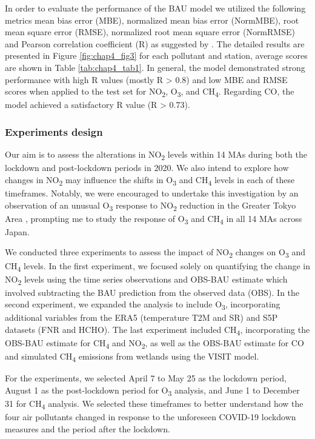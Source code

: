 In order to evaluate the performance of the BAU model we utilized the following metrics mean bias error (MBE), normalized mean bias error (NormMBE), root mean square error (RMSE), normalized root mean square error (NormRMSE) and Pearson correlation coefficient (R) as suggested by \citep{grange2021covid}. The detailed results are presented in Figure \ref{fig:chap4_fig3} for each pollutant and station, average scores are shown in Table \ref{tab:chap4_tab1}. In general, the model demonstrated strong performance with high R values (mostly R > 0.8) and low MBE and RMSE scores when applied to the test set for NO\textsubscript{2}, O\textsubscript{3}, and CH\textsubscript{4}. Regarding CO, the model achieved a satisfactory R value (R > 0.73).\par

\subsubsection{Experiments design}
Our aim is to assess the alterations in NO\textsubscript{2} levels within 14 MAs during both the lockdown and post-lockdown periods in 2020. We also intend to explore how changes in NO\textsubscript{2} may influence the shifts in O\textsubscript{3} and CH\textsubscript{4} levels in each of these timeframes. Notably, we were encouraged to undertake this investigation by an observation of an unusual O\textsubscript{3} response to NO\textsubscript{2} reduction in the Greater Tokyo Area \citep{damiani2022peculiar}, prompting me to study the response of O\textsubscript{3} and CH\textsubscript{4} in all 14 MAs across Japan. \par
We conducted three experiments to assess the impact of NO\textsubscript{2} changes on O\textsubscript{3} and CH\textsubscript{4} levels. In the first experiment, we focused solely on quantifying the change in NO\textsubscript{2} levels using the time series observations and OBS-BAU estimate which involved subtracting the BAU prediction from the observed data (OBS). In the second experiment, we expanded the analysis to include O\textsubscript{3}, incorporating additional variables  from the ERA5 (temperature \textminus T2M and SR) and S5P datasets (FNR and HCHO). The last experiment included CH\textsubscript{4}, incorporating the OBS-BAU estimate for CH\textsubscript{4} and NO\textsubscript{2}, as well as the OBS-BAU estimate for CO and simulated CH\textsubscript{4} emissions from wetlands using the VISIT model. \par
For the experiments, we selected April 7 to May 25 as the lockdown period, August 1 as the post-lockdown period for O\textsubscript{3} analysis, and June 1 to December 31 for CH\textsubscript{4} analysis. We selected these timeframes to better understand how the four air pollutants changed in response to the unforeseen COVID-19 lockdown measures and the period after the lockdown. \par


